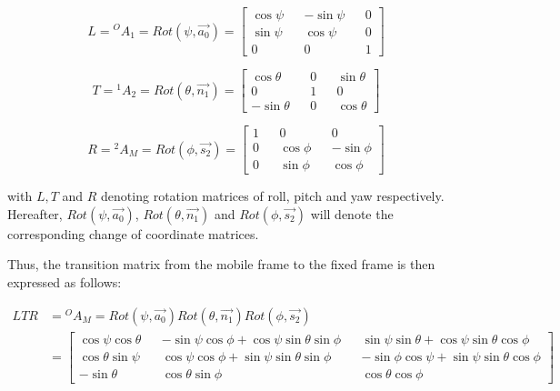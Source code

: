 \documentclass{thesisreport}
\begin{document}
\begin{equation}
	L = {}^{O}A_1 = Rot(\psi, \overrightarrow{a_0}) = \begin{bmatrix}
	\cos \psi && - \sin \psi && 0 \\
	\sin \psi && \cos \psi && 0 \\
	0 && 0 && 1 
	\end{bmatrix}
\end{equation}

\begin{equation}
	T = {}^{1}A_2 = Rot(\theta, \overrightarrow{n_1}) = \begin{bmatrix}
	\cos \theta && 0 && \sin \theta \\
	0 && 1 && 0 \\
	- \sin \theta && 0 && \cos \theta 
	\end{bmatrix}
\end{equation}

\begin{equation}
	R = {}^{2}A_M = Rot(\phi, \overrightarrow{s_2}) = \begin{bmatrix}
	1 && 0 && 0 \\
	0 && \cos \phi && - \sin \phi \\
	0 && \sin \phi && \cos \phi 
	\end{bmatrix}
\end{equation}

with $L, T$ and $R$ denoting rotation matrices of roll, pitch and yaw respectively.
Hereafter, $Rot(\psi, \overrightarrow{a_0})$, $Rot(\theta, \overrightarrow{n_1})$ and $Rot(\phi, \overrightarrow{s_2})$ will denote the corresponding change of coordinate matrices.

Thus, the transition matrix from the mobile frame to the fixed frame is then expressed as follows: 

\begin{align}
	LTR &= {}^{O}A_M = Rot(\psi, \overrightarrow{a_0}) Rot(\theta, \overrightarrow{n_1}) Rot(\phi, \overrightarrow{s_2}) \nonumber \\
	&= \begin{bmatrix}
	\cos \psi \cos \theta && - \sin \psi \cos \phi + \cos \psi \sin \theta \sin \phi && \sin \psi \sin \theta + \cos \psi \sin \theta \cos \phi \\
	\cos \theta \sin \psi && \cos \psi \cos \phi + \sin \psi \sin \theta \sin \phi && - \sin \phi \cos \psi + \sin \psi \sin \theta \cos \phi \\
	-\sin \theta && \cos \theta \sin \phi && \cos \theta \cos \phi
	\end{bmatrix}
\end{align}
\end{document}
